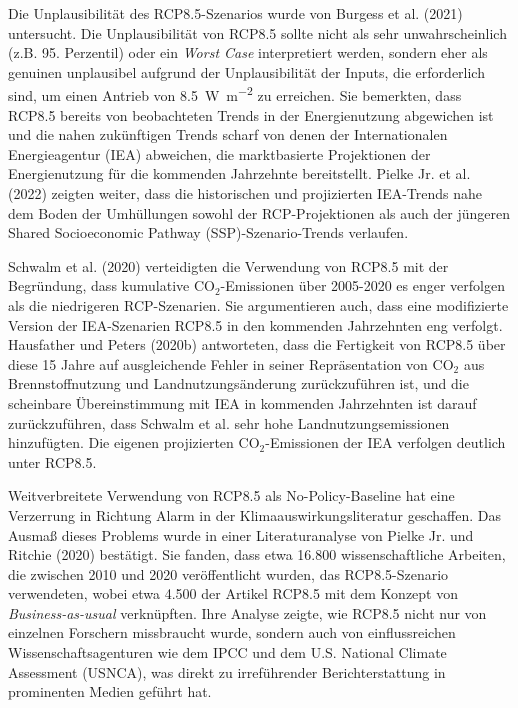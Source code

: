 \documentclass[12pt,paper=a4,DIV=12,parskip=never,chapterprefix=false,headings=standardclasses]{scrreprt}
\numberwithin{figure}{chapter}
\begin{document}
Die Unplausibilität des RCP8.5-Szenarios wurde von Burgess et al. (2021) untersucht. Die Unplausibilität von RCP8.5 sollte nicht als sehr unwahrscheinlich (z.B. 95. Perzentil) oder ein \emph{Worst Case} interpretiert werden, sondern eher als genuinen unplausibel aufgrund der Unplausibilität der Inputs, die erforderlich sind, um einen Antrieb von \SI{8.5}{\watt\per\square\meter} zu erreichen. Sie bemerkten, dass RCP8.5 bereits von beobachteten Trends in der Energienutzung abgewichen ist und die nahen zukünftigen Trends scharf von denen der Internationalen Energieagentur (IEA) abweichen, die marktbasierte Projektionen der Energienutzung für die kommenden Jahrzehnte bereitstellt. Pielke Jr. et al. (2022) zeigten weiter, dass die historischen und projizierten IEA-Trends nahe dem Boden der Umhüllungen sowohl der RCP-Projektionen als auch der jüngeren Shared Socioeconomic Pathway (SSP)-Szenario-Trends verlaufen.

Schwalm et al. (2020) verteidigten die Verwendung von RCP8.5 mit der Begründung, dass kumulative CO$_2$-Emissionen über 2005-2020 es enger verfolgen als die niedrigeren RCP-Szenarien. Sie argumentieren auch, dass eine modifizierte Version der IEA-Szenarien RCP8.5 in den kommenden Jahrzehnten eng verfolgt. Hausfather und Peters (2020b) antworteten, dass die Fertigkeit von RCP8.5 über diese 15 Jahre auf ausgleichende Fehler in seiner Repräsentation von CO$_2$ aus Brennstoffnutzung und Landnutzungsänderung zurückzuführen ist, und die scheinbare Übereinstimmung mit IEA in kommenden Jahrzehnten ist darauf zurückzuführen, dass Schwalm et al. sehr hohe Landnutzungsemissionen hinzufügten. Die eigenen projizierten CO$_2$-Emissionen der IEA verfolgen deutlich unter RCP8.5.

Weitverbreitete Verwendung von RCP8.5 als No-Policy-Baseline hat eine Verzerrung in Richtung Alarm in der Klimaauswirkungsliteratur geschaffen. Das Ausmaß dieses Problems wurde in einer Literaturanalyse von Pielke Jr. und Ritchie (2020) bestätigt. Sie fanden, dass etwa 16.800 wissenschaftliche Arbeiten, die zwischen 2010 und 2020 veröffentlicht wurden, das RCP8.5-Szenario verwendeten, wobei etwa 4.500 der Artikel RCP8.5 mit dem Konzept von \emph{Business-as-usual} verknüpften. Ihre Analyse zeigte, wie RCP8.5 nicht nur von einzelnen Forschern missbraucht wurde, sondern auch von einflussreichen Wissenschaftsagenturen wie dem IPCC und dem U.S. National Climate Assessment (USNCA), was direkt zu irreführender Berichterstattung in prominenten Medien geführt hat.
\end{document}
